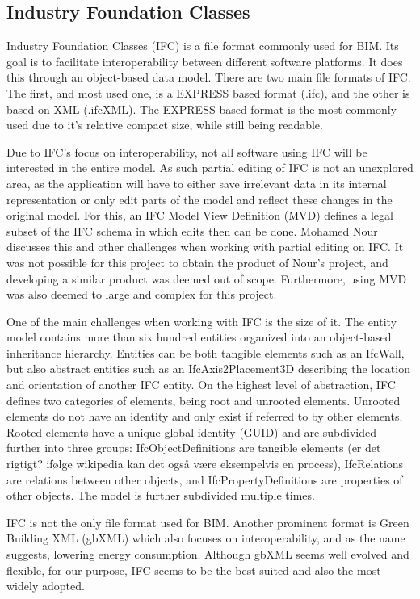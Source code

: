 \subsection{Industry Foundation Classes}
Industry Foundation Classes (IFC) is a file format commonly used for BIM. Its goal is to facilitate interoperability between different software platforms. It does this through an object-based data model. There are two main file formats of IFC. The first, and most used one, is a EXPRESS based format (.ifc), and the other is based on XML (.ifcXML). The EXPRESS based format is the most commonly used due to it's relative compact size, while still being readable.

Due to IFC's focus on interoperability, not all software using IFC will be interested in the entire model. As such partial editing of IFC is not an unexplored area, as the application will have to either save irrelevant data in its internal representation or only edit parts of the model and reflect these changes in the original model. For this, an IFC Model View Definition (MVD) defines a legal subset of the IFC schema\cite{mvd} in which edits then can be done. Mohamed Nour discusses this and other challenges when working with partial editing on IFC\cite{nour08}. It was not possible for this project to obtain the product of Nour's project, and developing a similar product was deemed out of scope. Furthermore, using MVD was also deemed to large and complex for this project.

One of the main challenges when working with IFC is the size of it. The entity model contains more than six hundred entities organized into an object-based inheritance hierarchy. Entities can be both tangible elements such as an IfcWall, but also abstract entities such as an IfcAxis2Placement3D describing the location and orientation of another IFC entity. On the highest level of abstraction, IFC defines two categories of elements, being root and unrooted elements. Unrooted elements do not have an identity and only exist if referred to by other elements. Rooted elements have a unique global identity (GUID) and are subdivided further into three groups: IfcObjectDefinitions are tangible elements (er det rigtigt? ifølge wikipedia kan det også være eksempelvis en process), IfcRelations are relations between other objects, and IfcPropertyDefinitions are properties of other objects. The model is further subdivided multiple times.

IFC is not the only file format used for BIM. Another prominent format is Green Building XML (gbXML) which also focuses on interoperability, and as the name suggests, lowering energy consumption. Although gbXML seems well evolved and flexible, for our purpose, IFC seems to be the best suited and also the most widely adopted.

